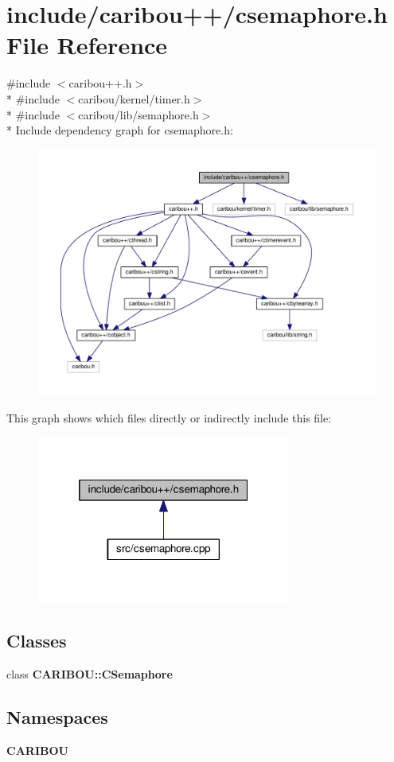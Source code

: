 \section{include/caribou++/csemaphore.h File Reference}
\label{csemaphore_8h}
{\ttfamily \#include $<$caribou++.\-h$>$}\\*
{\ttfamily \#include $<$caribou/kernel/timer.\-h$>$}\\*
{\ttfamily \#include $<$caribou/lib/semaphore.\-h$>$}\\*
Include dependency graph for csemaphore.\-h\-:\nopagebreak
\begin{figure}[H]
\begin{center}
\leavevmode
\includegraphics[width=350pt]{csemaphore_8h__incl}
\end{center}
\end{figure}
This graph shows which files directly or indirectly include this file\-:\nopagebreak
\begin{figure}[H]
\begin{center}
\leavevmode
\includegraphics[width=236pt]{csemaphore_8h__dep__incl}
\end{center}
\end{figure}
\subsection*{Classes}
\begin{DoxyCompactItemize}
\item 
class {\bf C\-A\-R\-I\-B\-O\-U\-::\-C\-Semaphore}
\end{DoxyCompactItemize}
\subsection*{Namespaces}
\begin{DoxyCompactItemize}
\item 
{\bf C\-A\-R\-I\-B\-O\-U}
\end{DoxyCompactItemize}
